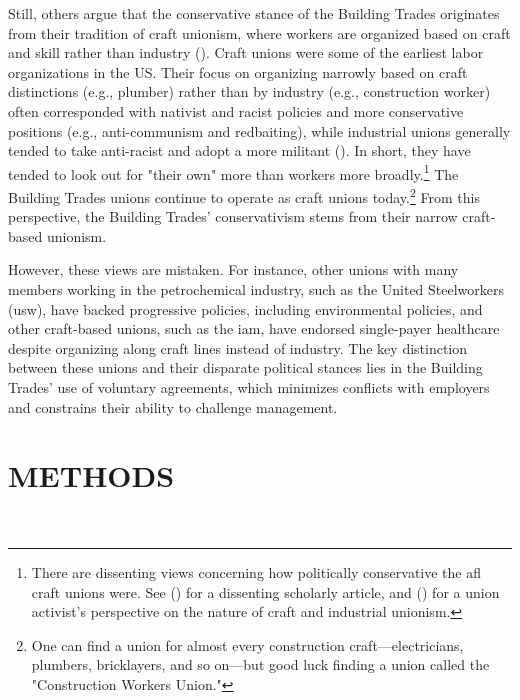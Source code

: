 \documentclass[12pt]{article}
\begin{document}
Still, others argue that the conservative stance of the Building Trades originates from their tradition of craft unionism, where workers are organized based on craft and skill rather than industry (\cite{roginComment1974, perlmanHistoryTradeUnionism1922, issermanGodBlessOur1976, fonerHistoryLaborMovement1996}). Craft unions were some of the earliest labor organizations in the US. Their focus on organizing narrowly based on craft distinctions (e.g., plumber) rather than by industry (e.g., construction worker) often corresponded with nativist and racist policies and more conservative positions (e.g., anti-communism and redbaiting), while industrial unions generally tended to take anti-racist and adopt a more militant (\cite{fonerHistoryLaborMovement1994}). In short, they have tended to look out for "their own" more than workers more broadly.\footnote{There are dissenting views concerning how politically conservative the \acrshort{afl} craft unions were. See \citeauthor{cobblePureSimpleRadicalism2013} (\citeyear{cobblePureSimpleRadicalism2013}) for a dissenting scholarly article, and \citeauthor{parkerAreIndustrialUnions2008} (\citeyear{parkerAreIndustrialUnions2008}) for a union activist's perspective on the nature of craft and industrial unionism.} The Building Trades unions continue to operate as craft unions today.\footnote{One can find a union for almost every construction craft---electricians, plumbers, bricklayers, and so on---but good luck finding a union called the "Construction Workers Union."} From this perspective, the Building Trades' conservativism stems from their narrow craft-based unionism.

However, these views are mistaken. For instance, other unions with many members working in the petrochemical industry, such as the United Steelworkers (\acrshort{usw}), have backed progressive policies, including environmental policies, and other craft-based unions, such as the \acrfull{iam}, have endorsed single-payer healthcare despite organizing along craft lines instead of industry. The key distinction between these unions and their disparate political stances lies in the Building Trades' use of voluntary agreements, which minimizes conflicts with employers and constrains their ability to challenge management.


\section{METHODS} \
\end{document}
